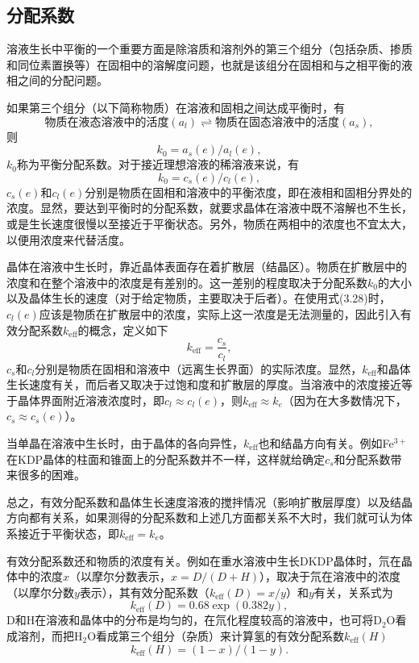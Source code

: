 \subsection{分配系数}
溶液生长中平衡的一个重要方面是除溶质和溶剂外的第三个组分（包括杂质、掺质和同位素置换等）在固相中的溶解度问题，也就是该组分在固相和与之相平衡的液相之间的分配问题。

如果第三个组分（以下简称物质）在溶液和固相之间达成平衡时，有
\begin{equation}
\text{物质在液态溶液中的活度}(a_l) \rightleftharpoons \text{物质在固态溶液中的活度}(a_s),
\end{equation}
则
\begin{equation}
k_0=a_s(e)/a_l(e),
\end{equation}
$k_0$称为平衡分配系数。对于接近理想溶液的稀溶液来说，有
\begin{equation}
k_0=c_s(e)/c_l(e),
\end{equation}
$c_s(e)$和$c_l(e)$分别是物质在固相和溶液中的平衡浓度，即在液相和固相分界处的浓度。显然，要达到平衡时的分配系数，就要求晶体在溶液中既不溶解也不生长，或是生长速度很慢以至接近于平衡状态。另外，物质在两相中的浓度也不宜太大，以便用浓度来代替活度。

晶体在溶液中生长时，靠近晶体表面存在着扩散层（结晶区）。物质在扩散层中的浓度和在整个溶液中的浓度是有差别的。这一差别的程度取决于分配系数$k_0$的大小以及晶体生长的速度（对于给定物质，主要取决于后者）。在使用式(3.28)时，$c_l(e)$应该是物质在扩散层中的浓度，实际上这一浓度是无法测量的，因此引入有效分配系数$k_\text{eff}$的概念，定义如下
\begin{equation} k_\text{eff} = \frac{c_s}{c_l}, \end{equation}
$c_s$和$c_l$分别是物质在固相和溶液中（远离生长界面）的实际浓度。显然，$k_\text{eff}$和晶体生长速度有关，而后者又取决于过饱和度和扩散层的厚度。当溶液中的浓度接近等于晶体界面附近溶液浓度时，即$c_l \approx c_l(e)$，则$k_\text{eff} \approx k_e$（因为在大多数情况下，$c_s \approx c_s(e)$）。

当单晶在溶液中生长时，由于晶体的各向异性，$k_\text{eff}$也和结晶方向有关。例如Fe$^{3+}$在KDP晶体的柱面和锥面上的分配系数并不一样，这样就给确定$c_s$和分配系数带来很多的困难。

总之，有效分配系数和晶体生长速度溶液的搅拌情况（影响扩散层厚度）以及结晶方向都有关系，如果测得的分配系数和上述几方面都关系不大时，我们就可认为体系接近于平衡状态，即$k_\text{eff} = k_e$。

有效分配系数还和物质的浓度有关。例如在重水溶液中生长DKDP晶体时，氘在晶体中的浓度$x$（以摩尔分数表示，$x=D/(D+H)$），取决于氘在溶液中的浓度（以摩尔分数$y$表示），其有效分配系数（$k_\text{eff}(D) = x/y$）和$y$有关，关系式为
\begin{equation}
k_\text{eff}(D) = 0.68\exp(0.382y),
\end{equation}
D和H在溶液和晶体中的分布是均匀的，在氘化程度较高的溶液中，也可将D$_2$O看成溶剂，而把H$_2$O看成第三个组分（杂质）来计算氢的有效分配系数$k_\text{eff}(H)$
\begin{equation}
k_\text{eff}(H)=(1-x)/(1-y).
\end{equation}